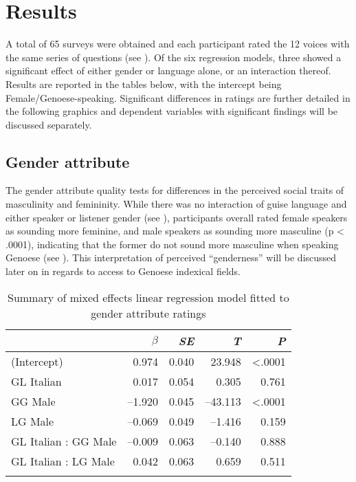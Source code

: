 \documentclass[output=paper,colorlinks,citecolor=brown]{langscibook}
\begin{document}
\section{Results}
A total of 65 surveys were obtained and each participant rated the 12 voices with the same series of questions (see ). Of the six regression models, three showed a significant effect of either gender or language alone, or an interaction thereof. Results are reported in the tables below, with the intercept being Female/Genoese-speaking. Significant differences in ratings are further detailed in the following graphics and dependent variables with significant findings will be discussed separately.

\subsection{Gender attribute}
\par The gender attribute quality tests for differences in the perceived social traits of masculinity and femininity. While there was no interaction of guise language and either speaker or listener gender (see ), participants overall rated female speakers as sounding more feminine, and male speakers as sounding more masculine (p < .0001), indicating that the former do not sound more masculine when speaking Genoese (see ). This interpretation of perceived “genderness” will be discussed later on in regards to access to Genoese indexical fields.

\begin{table}
\begin{tabularx}{\textwidth}{lrrrr}\lsptoprule
                     & $\beta$ & \textit{SE} & \textit{T} & \textit{P} \\ \midrule
(Intercept)\footnotemark          & 0.974   & 0.040        & 23.948     & <.0001     \\
GL Italian\footnotemark         & 0.017   & 0.054       & 0.305      & 0.761      \\
GG Male              & –1.920   & 0.045       & –43.113    & <.0001     \\
LG Male              & –0.069  & 0.049       & –1.416     & 0.159      \\
GL Italian : GG Male & –0.009  & 0.063       & –0.140     & 0.888      \\
GL Italian : LG Male & 0.042   & 0.063       & 0.659      & 0.511   \\  
\lspbottomrule
\end{tabularx}
\caption{Summary of mixed effects linear regression model fitted to gender attribute ratings}
\label{tab:licata:02}
\end{table}
\end{document}
